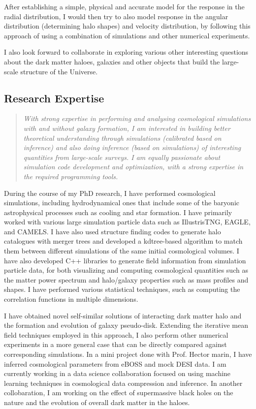 \documentclass[10pt]{article}
\begin{document}
After establishing a simple, physical and accurate model for the response in the radial distribution, I would then try to also model response in the angular distribution (determining halo shapes) and velocity distribution, by following this approach of using a combination of simulations and other numerical experiments.

I also look forward to collaborate in exploring various other interesting questions about the dark matter haloes, galaxies and other objects that build the large-scale structure of the Universe.

\subsection{Research Expertise}

\begin{quote}
    \textit{With strong expertise in performing and analysing cosmological simulations with and without galaxy formation, I am interested in building better theoretical understanding through simulations (calibrated based on inference) and also doing inference (based on simulations) of interesting quantities from large-scale surveys. I am equally passionate about simulation code development and optimization, with a strong expertise in the required programming tools.}
\end{quote}

During the course of my PhD research, I have performed cosmological simulations, including hydrodynamical ones that include some of the baryonic astrophysical processes such as cooling and star formation. I have primarily worked with various large simulation particle data such as IllustrisTNG, EAGLE, and CAMELS. I have also used structure finding codes to generate halo catalogues with merger trees and developed a kdtree-based algorithm to match them between different simulations of the same initial cosmological volumes. I have also developed C++ libraries to generate field information from simulation particle data, for both visualizing and computing cosmological quantities such as the matter power spectrum and halo/galaxy properties such as mass profiles and shapes. I have performed various statistical techniques, such as computing the correlation functions in multiple dimensions. 

I have obtained novel self-similar solutions of interacting dark matter halo and the formation and evolution of galaxy pseudo-disk. Extending the iterative mean field techniques employed in this approach, I also perform other numerical experiments in a more general case that can be directly compared against corresponding simulations. In a mini project done with Prof. Hector marin, I have inferred cosmological parameters from eBOSS and mock DESI data. I am currently working in a data science collaboration focused on using machine learning techniques in cosmological data compression and inference. In another collobaration, I am working on the effect of supermassive black holes on the nature and the evolution of overall dark matter in the haloes.
\end{document}
